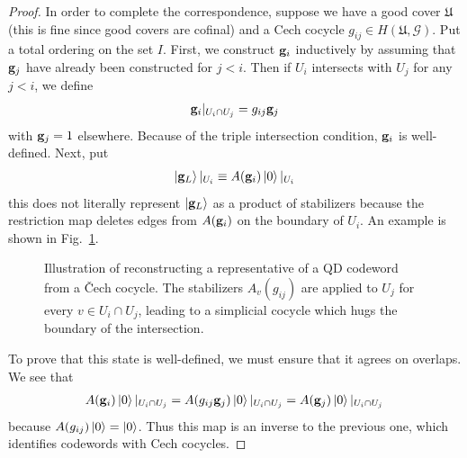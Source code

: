 \documentclass[11pt]{article}
\theoremstyle{definition}
\begin{document}
\begin{proof}
In order to complete the correspondence, suppose we have a good cover $\mathfrak
U$ (this is fine since good covers are cofinal) and a Cech cocycle $g_{ij} \in
H(\mathfrak U, \mathcal G)$. Put a total ordering on the set $I$. First, we
construct $\vb g_i$ inductively by assuming that $\vb g_j$ have already been
constructed for $j < i$. Then if $U_i$ intersects with $U_j$ for any $j < i$, we
define
\begin{align}
\vb g_i|_{U_i \cap U_j} = g_{ij}\vb g_j
\end{align}
with $\vb g_j = 1$ elsewhere. Because of the triple intersection condition, $\vb
g_{i}$ is well-defined. Next, put
\begin{align}
 \ket{\vb g_L}|_{U_i} \equiv A(\vb g_i)\ket{0}|_{U_i}
\end{align}
this does not literally represent $\ket{\vb g_L}$ as a product of stabilizers
because the restriction map deletes edges from $A(\vb g_i)$ on the boundary of
$U_i$. An example is shown in Fig.~\ref{fig:construct_cocycle}.
\begin{figure}
  \centering
  
  \caption{Illustration of reconstructing a representative of a QD codeword from
  a \v{C}ech cocycle. The stabilizers $A_v(g_{ij})$ are applied to $U_j$ for
  every $v \in U_i \cap U_j$, leading to a simplicial cocycle which hugs the
  boundary of the intersection.}
\label{fig:construct_cocycle}
\end{figure}
To prove that this state is well-defined, we must ensure that it agrees on
overlaps. We see that
\begin{align}
A(\vb g_i)\ket{0}|_{U_i \cap U_j} = A(g_{ij}\vb g_j)\ket{0}|_{U_i \cap U_j} = A(\vb g_j) \ket{0}|_{U_i \cap U_j}
\end{align}
because $A(g_{ij})\ket{0} = \ket{0}$. Thus this map is an inverse to the
previous one, which identifies codewords with Cech cocycles.
\end{proof}




\end{document}
